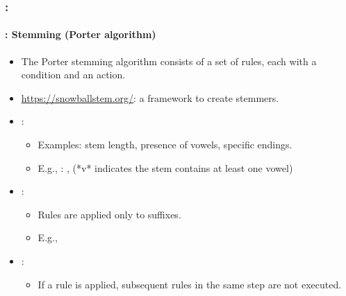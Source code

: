\documentclass[xcolor=table]{beamer}
\begin{document}
\begin{frame}
	\frametitle{\insertshortsubtitle: \insertsection}
	\framesubtitle{\insertsubsection: Stemming (Porter algorithm)}
	
	\begin{itemize}
		\item The Porter stemming algorithm consists of a set of rules, each with a condition and an action.
		\item \url{https://snowballstem.org/}: a framework to create stemmers.
		\item {}:
		\begin{itemize}
			\item Examples: stem length, presence of vowels, specific endings.
			\item E.g., : ,  
			(*v* indicates the stem contains at least one vowel)
		\end{itemize}
		\item {}:
		\begin{itemize}
			\item Rules are applied only to suffixes.
			\item E.g., 
		\end{itemize}
		\item {}:
		\begin{itemize}
			\item If a rule is applied, subsequent rules in the same step are not executed.
		\end{itemize}
	\end{itemize}

\end{frame}
\end{document}
